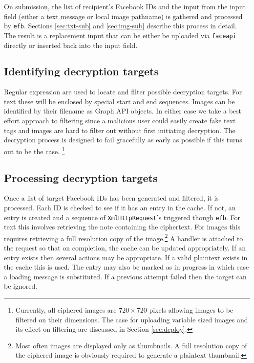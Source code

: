 On submission, the list of recipient's Facebook IDs and the input from the input field (either a text message or local image pathname) is gathered and processed by {\tt efb}. Sections \ref{sec:txt-sub} and \ref{sec:img-sub} describe this process in detail. The result is a replacement input that can be either be uploaded via {\tt faceapi} directly or inserted back into the input field.

\subsection{Identifying decryption targets}
\label{ssec:ident-targets}

Regular expression are used to locate and filter possible decryption targets. For text these will be enclosed by special start and end sequences. Images can be identified by their filename as Graph API objects. In either case we take a best effort approach to filtering since a malicious user could easily create fake text tags and images are hard to filter out without first initiating decryption. The decryption process is designed to fail gracefully as early as possible if this turns out to be the case. \footnote{Currently, all ciphered images are $720 \times 720$ pixels allowing images to be filtered on their dimensions. The case for uploading variable sized images and its effect on filtering are discussed in Section \ref{sec:deploy}.}

    
\subsection{Processing decryption targets}

Once a list of target Facebook IDs has been generated and filtered, it is processed. Each ID is checked to see if it has an entry in the cache. If not, an entry is created and a sequence of {\tt XmlHttpRequest}'s triggered though {\tt efb}. For text this involves retrieving the note containing the ciphertext. For images this requires retrieving a full resolution copy of the image.\footnote{Most often images are displayed only as thumbnails. A full resolution copy of the ciphered image is obviously required to generate a plaintext thumbnail.} A handler is attached to the request so that on completion, the cache can be updated appropriately. If an entry exists then several actions may be appropriate. If a valid plaintext exists in the cache this is used. The entry may also be marked as in progress in which case a loading message is substituted. If a previous attempt failed then the target can be ignored.

